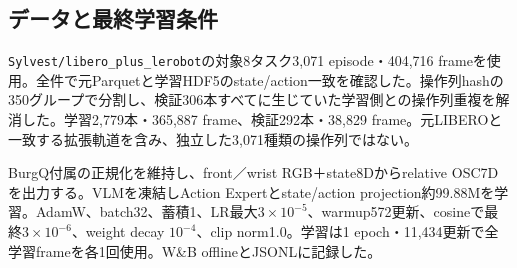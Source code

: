 \documentclass[paper=a4,fontsize=10pt,baselineskip=15pt]{jlreq}
\begin{document}
\subsection{データと最終学習条件}
\texttt{Sylvest/libero\_plus\_lerobot}の対象8タスク3,071 episode・404,716 frameを使用。全件で元Parquetと学習HDF5のstate/action一致を確認した。操作列hashの350グループで分割し、検証306本すべてに生じていた学習側との操作列重複を解消した。学習2,779本・365,887 frame、検証292本・38,829 frame。元LIBEROと一致する拡張軌道を含み、独立した3,071種類の操作列ではない。

BurgQ付属の正規化を維持し、front／wrist RGB＋state8Dからrelative OSC7Dを出力する。VLMを凍結しAction Expertとstate/action projection約99.88Mを学習。AdamW、batch32、蓄積1、LR最大$3\times10^{-5}$、warmup572更新、cosineで最終$3\times10^{-6}$、weight decay $10^{-4}$、clip norm1.0。学習は1 epoch・11,434更新で全学習frameを各1回使用。W\&B offlineとJSONLに記録した。
\newpage
\end{document}
